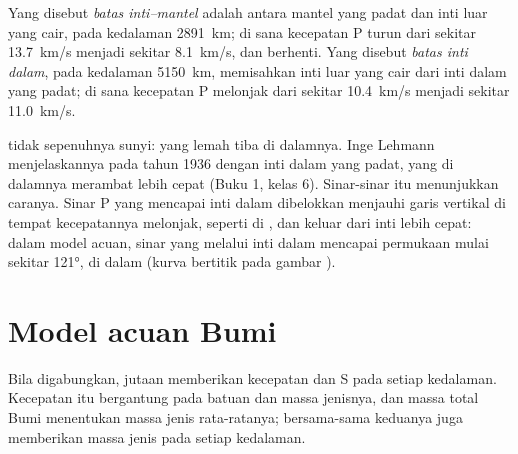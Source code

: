 \begin{definition}\label{def:g11:seismic-structure:core}
Yang disebut \emph{batas inti--mantel} adalah
 antara mantel yang padat dan inti luar yang cair, pada
kedalaman \qty{2891}{km}; di sana kecepatan P turun dari sekitar
\qty{13.7}{km/s} menjadi sekitar \qty{8.1}{km/s}, dan  berhenti.
Yang disebut \emph{batas inti dalam}, pada kedalaman
\qty{5150}{km}, memisahkan inti luar yang cair dari inti dalam yang padat; di
sana kecepatan P melonjak dari sekitar \qty{10.4}{km/s} menjadi sekitar
\qty{11.0}{km/s}.
\end{definition}

 tidak sepenuhnya sunyi:  yang lemah tiba di dalamnya.
Inge Lehmann menjelaskannya pada tahun 1936 dengan inti dalam yang padat, yang
di dalamnya  merambat lebih cepat (Buku 1, kelas 6). Sinar-sinar itu
menunjukkan caranya. Sinar P yang mencapai inti dalam dibelokkan menjauhi garis
vertikal di tempat kecepatannya melonjak, seperti di , dan keluar dari inti
lebih cepat: dalam model acuan, sinar yang melalui inti dalam mencapai permukaan
mulai sekitar \ang{121}, di dalam  (kurva bertitik pada gambar
).

\section{Model acuan Bumi}\label{sec:g11:seismic-structure:model}

Bila digabungkan, jutaan  memberikan kecepatan  dan S
pada setiap kedalaman. Kecepatan itu bergantung pada batuan dan massa jenisnya,
dan massa total Bumi menentukan massa jenis rata-ratanya; bersama-sama keduanya
juga memberikan massa jenis pada setiap kedalaman.

